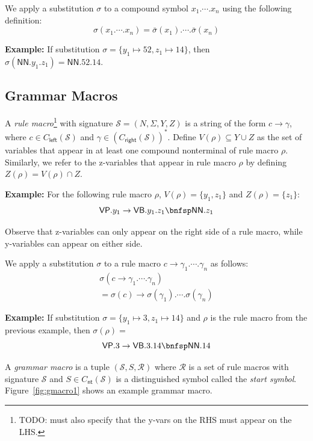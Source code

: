 \documentclass[11pt]{article}
\renewcommand{\bnfpo}{\rightarrow}
\begin{document}
We apply a substitution $\sigma$ to a compound symbol $x_1.\cdots.x_n$ using the following definition:
\begin{equation*}
\sigma(x_1.\cdots.x_n) = \bar{\sigma}(x_1).\cdots.\bar{\sigma}(x_n)
\end{equation*}

\textbf{Example: } If substitution $\sigma = \{ y_1 \mapsto 52, z_1 \mapsto 14 \}$, then $\sigma(\mathsf{NN}.y_1.z_1) = \mathsf{NN}.52.14$.


\subsection{Grammar Macros}

A \emph{rule macro}\footnote{TODO: must also specify that the y-vars on the RHS must appear on the LHS.} with signature $\mathcal{S} = (N, \Sigma, Y, Z)$ is a string of the form $c \bnfpo \gamma$, where $c \in C_{\mathsf{left}}(\mathcal{S})$ and $\gamma \in (C_{\mathsf{right}}(\mathcal{S}))^*$. Define $V(\rho) \subseteq Y \cup Z$ as the set of variables that appear in at least one compound nonterminal of rule macro $\rho$. Similarly, we refer to the z-variables that appear in rule macro $\rho$ by defining $Z(\rho) = V(\rho) \cap Z$.

\textbf{Example: } For the following rule macro $\rho$, $V(\rho) = \{y_1, z_1\}$ and $Z(\rho) = \{z_1\}$:
\begin{equation*}
	\mathsf{VP}.y_1 \bnfpo \mathsf{VB}.y_1.z_1 \bnfsp \mathsf{NN}.z_1
\end{equation*}

\noindent Observe that z-variables can only appear on the right side of a rule macro, while y-variables can appear on either side.

We apply a substitution $\sigma$ to a rule macro $c \bnfpo \gamma_1.\cdots.\gamma_n$ as follows:
\begin{multline*}
\sigma(c \bnfpo \gamma_1.\cdots.\gamma_n) \\
= \sigma(c) \bnfpo \sigma(\gamma_1).\cdots.\sigma(\gamma_n)
\end{multline*}

\textbf{Example: } If substitution $\sigma = \{ y_1 \mapsto 3, z_1 \mapsto 14 \}$ and $\rho$ is the rule macro from the previous example, then $\sigma(\rho) =$
\begin{equation*}
	\mathsf{VP}.3 \bnfpo \mathsf{VB}.3.14 \bnfsp \mathsf{NN}.14
\end{equation*}

A \emph{grammar macro} is a tuple $(\mathcal{S}, S, \mathcal{R})$ where $\mathcal{R}$ is a set of rule macros with signature $\mathcal{S}$ and $S \in C_{\mathsf{nt}}(\mathcal{S})$ is a distinguished symbol called the \emph{start symbol}. Figure~\ref{fig:gmacro1} shows an example grammar macro.
\end{document}
